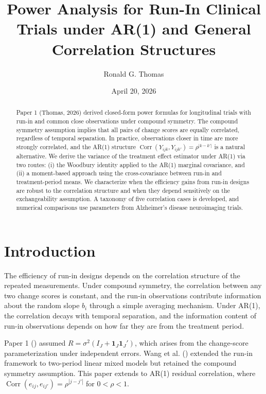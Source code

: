 \documentclass[
  11pt,
]{article}
\title{Power Analysis for Run-In Clinical Trials under AR(1) and General
Correlation Structures}
\author{Ronald G. Thomas}
\date{April 20, 2026}
\DeclareMathOperator{\Corr}{Corr}
\begin{document}
\maketitle
\begin{abstract}
Paper 1 (Thomas, 2026) derived closed-form power formulas for
longitudinal trials with run-in and common close observations under
compound symmetry. The compound symmetry assumption implies that all
pairs of change scores are equally correlated, regardless of temporal
separation. In practice, observations closer in time are more strongly
correlated, and the AR(1) structure
\(\Corr(Y_{ijk}, Y_{ijk'}) = \rho^{|k-k'|}\) is a natural alternative.
We derive the variance of the treatment effect estimator under AR(1) via
two routes: (i) the Woodbury identity applied to the AR(1) marginal
covariance, and (ii) a moment-based approach using the cross-covariance
between run-in and treatment-period means. We characterize when the
efficiency gains from run-in designs are robust to the correlation
structure and when they depend sensitively on the exchangeability
assumption. A taxonomy of five correlation cases is developed, and
numerical comparisons use parameters from Alzheimer's disease
neuroimaging trials.
\end{abstract}

{
\setcounter{tocdepth}{2}
\tableofcontents
}
\section{Introduction}\label{introduction}

The efficiency of run-in designs depends on the correlation structure of
the repeated measurements. Under compound symmetry, the correlation
between any two change scores is constant, and the run-in observations
contribute information about the random slope \(b_i\) through a simple
averaging mechanism. Under AR(1), the correlation decays with temporal
separation, and the information content of run-in observations depends
on how far they are from the treatment period.

Paper 1 () assumed
\(R = \sigma^2(I_J +
\mathbf{1}_J\mathbf{1}_J')\), which arises from the change-score
parameterization under independent errors. Wang et al.
() extended the run-in framework to
two-period linear mixed models but retained the compound symmetry
assumption. This paper extends to AR(1) residual correlation, where
\(\mathop{\mathrm{Corr}}(e_{ij}, e_{ij'}) =
\rho^{|j-j'|}\) for \(0 < \rho < 1\).
\end{document}
